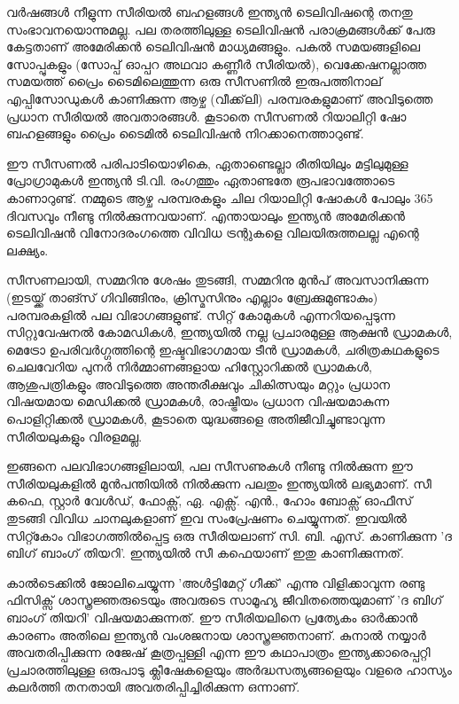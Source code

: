 \vskip 2pt

വര്‍ഷങ്ങള്‍ നീളുന്ന സീരിയല്‍ ബഹളങ്ങള്‍ ഇന്ത്യന്‍ ടെലിവിഷന്റെ തനതു സംഭാവനയൊന്നുമല്ല. പല തരത്തിലുള്ള ടെലിവിഷന്‍ 
പരാക്രമങ്ങള്‍ക്ക് പേരു കേട്ടതാണ് അമേരിക്കന്‍ ടെലിവിഷന്‍ മാധ്യമങ്ങളും. പകല്‍ സമയങ്ങളിലെ സോപ്പുകളും 
(സോപ്പ് ഓപ്പറ അഥവാ കണ്ണീര്‍ സീരിയല്‍), വെക്കേഷനല്ലാത്ത സമയത്ത് പ്രൈം ടൈമിലെത്തുന്ന ഒരു സീസണില്‍ 
ഇരുപത്തിനാല് എപ്പിസോഡുകള്‍ കാണിക്കുന്ന ആഴ്ച (വീക്ക്‌ലി) പരമ്പരകളുമാണ് അവിടുത്തെ പ്രധാന സീരിയല്‍ അവതാരങ്ങള്‍. 
കൂടാതെ സീസണല്‍ റിയാലിറ്റി ഷോ ബഹളങ്ങളും പ്രൈം ടൈമില്‍ ടെലിവിഷന്‍ നിറക്കാനെത്താറുണ്ട്.

ഈ സീസണല്‍ പരിപാടിയൊഴികെ, ഏതാണ്ടെല്ലാ രീതിയിലും മട്ടിലുമുള്ള പ്രോഗ്രാമുകള്‍ ഇന്ത്യന്‍ ടി.വി. രംഗത്തും ഏതാണ്ടതേ
 രൂപഭാവത്തോടെ കാണാറുണ്ട്. നമ്മുടെ ആഴ്ച പരമ്പരകളും ചില റിയാലിറ്റി ഷോകള്‍ പോലും 365 ദിവസവും നീണ്ടു നില്‍ക്കുന്നവയാണ്.
  എന്തായാലും ഇന്ത്യന്‍ അമേരിക്കന്‍ ടെലിവിഷന്‍ വിനോദരംഗത്തെ വിവിധ ട്രന്റുകളെ വിലയിരുത്തലല്ല എന്റെ ലക്ഷ്യം.

സീസണലായി, സമ്മറിനു ശേഷം തുടങ്ങി, സമ്മറിനു മുന്‍പ് അവസാനിക്കുന്ന (ഇടയ്ക്ക് താങ്സ് ഗിവിങ്ങിനും, ക്രിസ്മസിനും എല്ലാം 
ബ്രേക്കുമുണ്ടാകും) പരമ്പരകളില്‍ പല വിഭാഗങ്ങളുണ്ട്. സിറ്റ് കോമുകള്‍ എന്നറിയപ്പെടുന്ന സിറ്റുവേഷനല്‍ കോമഡികള്‍, ഇന്ത്യയില്‍ 
നല്ല പ്രചാരമുള്ള ആക്ഷന്‍ ഡ്രാമകള്‍, മെട്രോ ഉപരിവര്‍ഗ്ഗത്തിന്റെ ഇഷ്ടവിഭാഗമായ ടീന്‍ ഡ്രാമകള്‍, ചരിത്രകഥകളുടെ ചെലവേറിയ
 പുനര്‍ നിര്‍മ്മാണങ്ങളായ ഹിസ്റ്റോറിക്കല്‍ ഡ്രാമകള്‍, ആശുപത്രികളും അവിടുത്തെ അന്തരീക്ഷവും ചികിത്സയും മറ്റും പ്രധാന 
 വിഷയമായ മെഡിക്കല്‍ ഡ്രാമകള്‍, രാഷ്ട്രീയം പ്രധാന വിഷയമാകുന്ന പൊളിറ്റിക്കല്‍ ഡ്രാമകള്‍, കൂടാതെ യുദ്ധങ്ങളെ 
 അതിജീവിച്ചുണ്ടാവുന്ന സീരിയലുകളും വിരളമല്ല.

ഇങ്ങനെ പലവിഭാഗങ്ങളിലായി, പല സീസണുകള്‍ നീണ്ടു നില്‍ക്കുന്ന ഈ സീരിയലുകളില്‍ മുന്‍പന്തിയില്‍ നില്‍ക്കുന്ന പലതും 
ഇന്ത്യയില്‍ ലഭ്യമാണ്. സീ കഫെ, സ്റ്റാര്‍ വേള്‍ഡ്, ഫോക്സ്, ഏ. എക്സ്. എന്‍., ഹോം ബോക്സ് ഓഫീസ് തുടങ്ങി വിവിധ ചാനലുകളാണ് 
ഇവ സംപ്രേഷണം ചെയ്യുന്നത്. ഇവയില്‍ സിറ്റ്കോം വിഭാഗത്തില്‍പ്പെട്ട ഒരു സീരിയലാണ് സി. ബി. എസ്. കാണിക്കുന്ന 
'ദ ബിഗ് ബാംഗ് തിയറി'. ഇന്ത്യയില്‍ സീ കഫെയാണ് ഇതു കാണിക്കുന്നത്.

കാല്‍ടെക്കില്‍ ജോലിചെയ്യുന്ന 'അള്‍ട്ടിമേറ്റ് ഗീക്ക്' എന്നു വിളിക്കാവുന്ന രണ്ടു ഫിസിക്സ് ശാസ്ത്രജ്ഞരുടെയും അവരുടെ
 സാമൂഹ്യ ജീവിതത്തെയുമാണ് 'ദ ബിഗ് ബാംഗ് തിയറി' വിഷയമാക്കുന്നത്. ഈ സീരിയലിനെ പ്രത്യേകം ഓര്‍ക്കാന്‍ കാരണം 
 അതിലെ ഇന്ത്യന്‍ വംശജനായ ശാസ്ത്രജ്ഞനാണ്. കുനാല്‍ നയ്യാര്‍ അവതരിപ്പിക്കുന്ന രജേഷ് കൂത്രപ്പള്ളി എന്ന ഈ കഥാപാത്രം 
 ഇന്ത്യക്കാരെപ്പറ്റി പ്രചാരത്തിലുള്ള ഒരുപാടു ക്ലീഷേകളെയും അര്‍ദ്ധസത്യങ്ങളെയും വളരെ ഹാസ്യം കലര്‍ത്തി തനതായി
  അവതരിപ്പിച്ചിരിക്കുന്ന ഒന്നാണ്.



